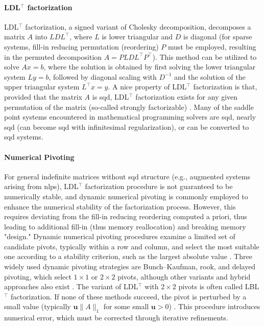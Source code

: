 \documentclass{article}
\begin{document}
\paragraph{LDL$^\top$ factorization}
LDL$^\top$ factorization, a signed variant of Cholesky decomposition, decomposes a matrix $A$ into $LDL^\top$, where $L$ is lower triangular and $D$ is diagonal (for sparse systems, fill-in reducing permutation (reordering) $P$ must be employed, resulting in the permuted decomposition $A = P L D L^\top P^\top$). This method can be utilized to solve $Ax = b$, where the solution is obtained by first solving the lower triangular system $Ly = b$, followed by diagonal scaling with $D^{-1}$ and the solution of the upper triangular system $L^\top x = y$. A nice property of LDL$^\top$ factorization is that, provided that the matrix $A$ is \gls*{sqd}, LDL$^\top$ factorization exists for any given permutation of the matrix (so-called strongly factorizable) \cite{vanderbeiSymmetricQuasidefiniteMatrices1995}. Many of the saddle point systems encountered in mathematical programming solvers are \gls*{sqd}, nearly \gls*{sqd} (can become \gls*{sqd} with infinitesimal regularization), or can be converted to \gls*{sqd} systems. 



\paragraph{Numerical Pivoting}

For general indefinite matrices without \gls*{sqd} structure (e.g., augmented systems \cite{wachterImplementationInteriorpointFilter2006} arising from \glspl*{nlp}), LDL$^\top$ factorization procedure is not guaranteed to be numerically stable, and dynamic numerical pivoting is commonly employed to enhance the numerical stability of the factorization process. However, this requires deviating from the fill-in reducing reordering computed a priori, thus leading to additional fill-in (thus memory reallocation) and breaking memory "design." Dynamic numerical pivoting procedures examine a limited set of candidate pivots, typically within a row and column, and select the most suitable one according to a stability criterion, such as the largest absolute value \cite{schenkFASTFACTORIZATIONPIVOTING}. Three widely used dynamic pivoting strategies are Bunch–Kaufman, rook, and delayed pivoting, which select $1 \times 1$ or $2 \times 2$ pivots, although other variants and hybrid approaches also exist \cite{}. The variant of LDL$^\top$ with $2 \times 2$ pivots is often called LBL$^\top$ factorization. If none of these methods succeed, the pivot is perturbed by a small value (typically $\mathbf{u}\|A\|_1$ for some small $\mathbf{u} > 0$) \cite{schenkFASTFACTORIZATIONPIVOTING}. This procedure introduces numerical error, which must be corrected through iterative refinements.
\end{document}

